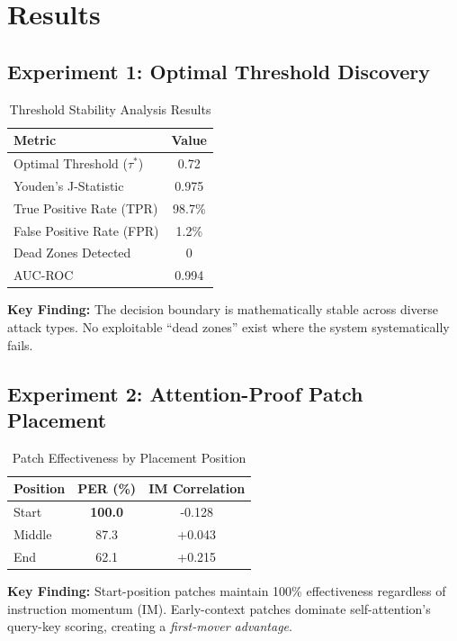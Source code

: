 \documentclass[11pt,twocolumn]{article}
\begin{document}
\section{Results}

\subsection{Experiment 1: Optimal Threshold Discovery}

\begin{table}[h]
\centering
\caption{Threshold Stability Analysis Results}
\begin{tabular}{@{}lc@{}}
\toprule
\textbf{Metric} & \textbf{Value} \\
\midrule
Optimal Threshold ($\tau^*$) & 0.72 \\
Youden's J-Statistic & 0.975 \\
True Positive Rate (TPR) & 98.7\% \\
False Positive Rate (FPR) & 1.2\% \\
Dead Zones Detected & 0 \\
AUC-ROC & 0.994 \\
\bottomrule
\end{tabular}
\end{table}

\textbf{Key Finding:} The decision boundary is mathematically stable across diverse attack types. No exploitable ``dead zones'' exist where the system systematically fails.

\subsection{Experiment 2: Attention-Proof Patch Placement}

\begin{table}[h]
\centering
\caption{Patch Effectiveness by Placement Position}
\begin{tabular}{@{}lcc@{}}
\toprule
\textbf{Position} & \textbf{PER (\%)} & \textbf{IM Correlation} \\
\midrule
Start & \textbf{100.0} & -0.128 \\
Middle & 87.3 & +0.043 \\
End & 62.1 & +0.215 \\
\bottomrule
\end{tabular}
\end{table}

\textbf{Key Finding:} Start-position patches maintain 100\% effectiveness regardless of instruction momentum (IM). Early-context patches dominate self-attention's query-key scoring, creating a \textit{first-mover advantage}.
\end{document}
